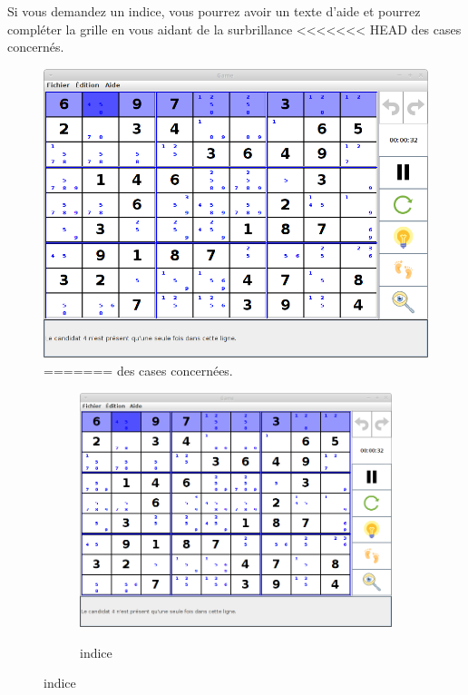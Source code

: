 \newpage
Si vous demandez un indice, vous pourrez avoir un texte d'aide 
et pourrez compléter la grille en vous aidant de la surbrillance 
<<<<<<< HEAD
des cases concernés.  
\begin{figure}[ht]
  \caption{\label{annexe13} indice}
  \includegraphics [width=130mm]{images/clue.png} \\[0.5cm]
=======
des cases concernées.  
\begin{figure}[ht]
  \caption{\label{annexe13} indice}
  \includegraphics [width=130mm]{images/clue.png} \\[0.5cm]
\end{figure}


\end{figure}

